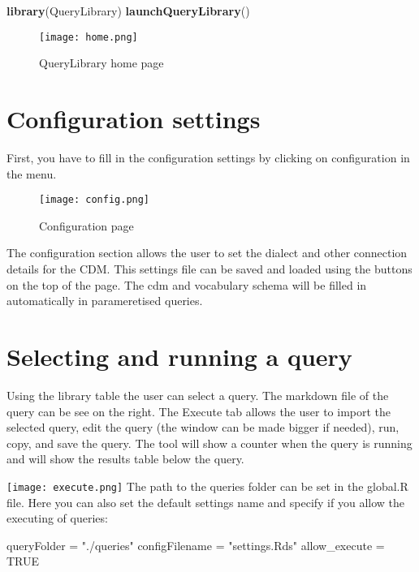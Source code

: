 \documentclass[]{article}
\newenvironment{Shaded}{\begin{snugshade}}{\end{snugshade}}
\newcommand{\KeywordTok}[1]{\textcolor[rgb]{0.13,0.29,0.53}{\textbf{#1}}}
\newcommand{\NormalTok}[1]{#1}
\newcommand{\OtherTok}[1]{\textcolor[rgb]{0.56,0.35,0.01}{#1}}
\newcommand{\StringTok}[1]{\textcolor[rgb]{0.31,0.60,0.02}{#1}}
\begin{document}
\begin{Shaded}
\begin{Highlighting}[]
\KeywordTok{library}\NormalTok{(QueryLibrary)}
\KeywordTok{launchQueryLibrary}\NormalTok{()}
\end{Highlighting}
\end{Shaded}

\begin{figure}
\centering
\texttt{[image: home.png]}
\caption{QueryLibrary home page}
\end{figure}

\hypertarget{configuration-settings}{%
\section{Configuration settings}\label{configuration-settings}}

First, you have to fill in the configuration settings by clicking on
configuration in the menu.

\begin{figure}
\centering
\texttt{[image: config.png]}
\caption{Configuration page}
\end{figure}

The configuration section allows the user to set the dialect and other
connection details for the CDM. This settings file can be saved and
loaded using the buttons on the top of the page. The cdm and vocabulary
schema will be filled in automatically in parameretised queries.

\hypertarget{selecting-and-running-a-query}{%
\section{Selecting and running a
query}\label{selecting-and-running-a-query}}

Using the library table the user can select a query. The markdown file
of the query can be see on the right. The Execute tab allows the user to
import the selected query, edit the query (the window can be made bigger
if needed), run, copy, and save the query. The tool will show a counter
when the query is running and will show the results table below the
query.

\texttt{[image: execute.png]} The path to the queries folder can be set
in the global.R file. Here you can also set the default settings name
and specify if you allow the executing of queries:

\begin{Shaded}
\begin{Highlighting}[]
\NormalTok{queryFolder =}\StringTok{ "./queries"}
\NormalTok{configFilename =}\StringTok{ "settings.Rds"}
\NormalTok{allow_execute =}\StringTok{ }\OtherTok{TRUE}
\end{Highlighting}
\end{Shaded}
\end{document}
